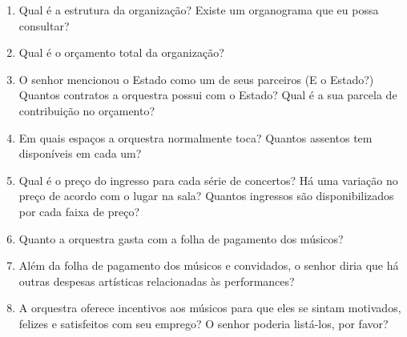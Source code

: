 \documentclass[a4paper, 12pt, openright, oneside, german, french, english, brazil]{abntex2}
\begin{document}
\begin{enumerate}
		\item Qual é a estrutura da organização? Existe um organograma que eu possa consultar?
		
		
		\item Qual é o orçamento total da organização?
		
		
		\item O senhor mencionou o Estado como um de seus parceiros (E o Estado?) Quantos contratos a orquestra possui com o Estado? Qual é a sua parcela de contribuição no orçamento?
		
		

		
		\item Em quais espaços a orquestra normalmente toca? Quantos assentos tem disponíveis em cada um?
		
		\item Qual é o preço do ingresso para cada série de concertos? Há uma variação no preço de acordo com o lugar na sala? Quantos ingressos são disponibilizados por cada faixa de preço?
		
		\item Quanto a orquestra gasta com a folha de pagamento dos músicos?
		
		\item Além da folha de pagamento dos músicos e convidados, o senhor diria que há outras despesas artísticas relacionadas às performances?
		
		\item A orquestra oferece incentivos aos músicos para que eles se sintam motivados, felizes e satisfeitos com seu emprego? O senhor poderia listá-los, por favor?
		
	\end{enumerate}
	
\end{document}
